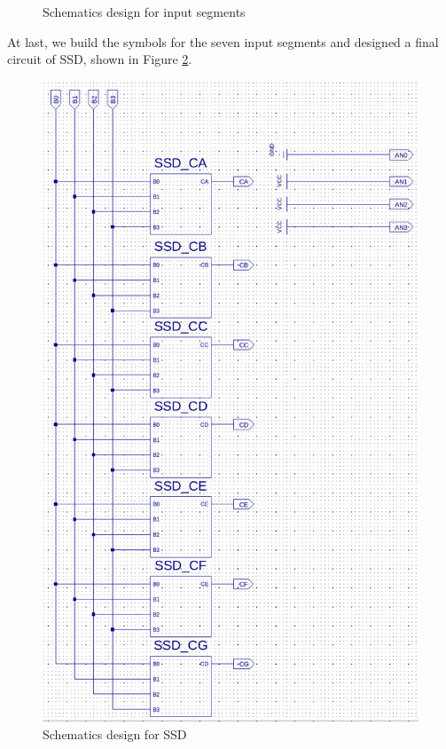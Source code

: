 \documentclass{article}
\begin{document}
\begin{figure}[!hbtp]
\caption{Schematics design for input segments}
\label{design-segment}
\end{figure}

At last, we build the symbols for the seven input segments and designed a final circuit of SSD, shown in Figure \ref{design-ssd}. \\

\begin{figure}[!hbtp]
\centering
\includegraphics[width=0.7\linewidth]{ssd.png}
\caption{Schematics design for SSD}
\label{design-ssd}
\end{figure}

\newpage
\end{document}
